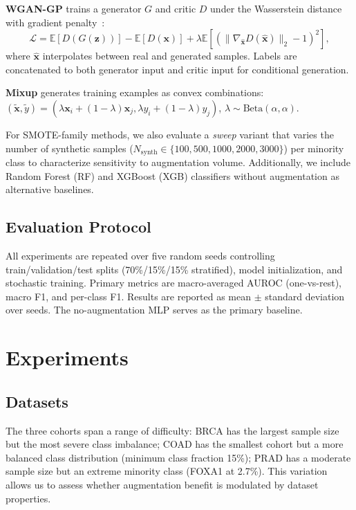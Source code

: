 \documentclass{article}
\begin{document}
\textbf{WGAN-GP} trains a generator $G$ and critic $D$ under the Wasserstein distance with
gradient penalty~\cite{Gulrajani2017}:
\begin{equation}
  \mathcal{L} = \mathbb{E}[D(G(\mathbf{z}))] - \mathbb{E}[D(\mathbf{x})]
    + \lambda \mathbb{E}[(\|\nabla_{\hat{\mathbf{x}}} D(\hat{\mathbf{x}})\|_2 - 1)^2],
\end{equation}
where $\hat{\mathbf{x}}$ interpolates between real and generated samples. Labels are concatenated
to both generator input and critic input for conditional generation.

\textbf{Mixup} generates training examples as convex combinations:
$(\tilde{\mathbf{x}}, \tilde{y}) = (\lambda \mathbf{x}_i + (1-\lambda)\mathbf{x}_j,
\lambda y_i + (1-\lambda)y_j)$, $\lambda \sim \text{Beta}(\alpha, \alpha)$.

For SMOTE-family methods, we also evaluate a \emph{sweep} variant that varies the number of
synthetic samples ($N_\text{synth} \in \{100, 500, 1000, 2000, 3000\}$) per minority class to
characterize sensitivity to augmentation volume. Additionally, we include Random Forest (RF)
and XGBoost (XGB) classifiers without augmentation as alternative baselines.

\subsection{Evaluation Protocol}

All experiments are repeated over five random seeds controlling train/validation/test splits
(70\%/15\%/15\% stratified), model initialization, and stochastic training. Primary metrics are
macro-averaged AUROC (one-vs-rest), macro F1, and per-class F1. Results are reported as mean
$\pm$ standard deviation over seeds. The no-augmentation MLP serves as the primary baseline.

\section{Experiments}

\subsection{Datasets}

The three cohorts span a range of difficulty: BRCA has the largest sample size but the most
severe class imbalance; COAD has the smallest cohort but a more balanced class distribution
(minimum class fraction 15\%); PRAD has a moderate sample size but an extreme minority class
(FOXA1 at 2.7\%). This variation allows us to assess whether augmentation benefit is
modulated by dataset properties.
\end{document}
